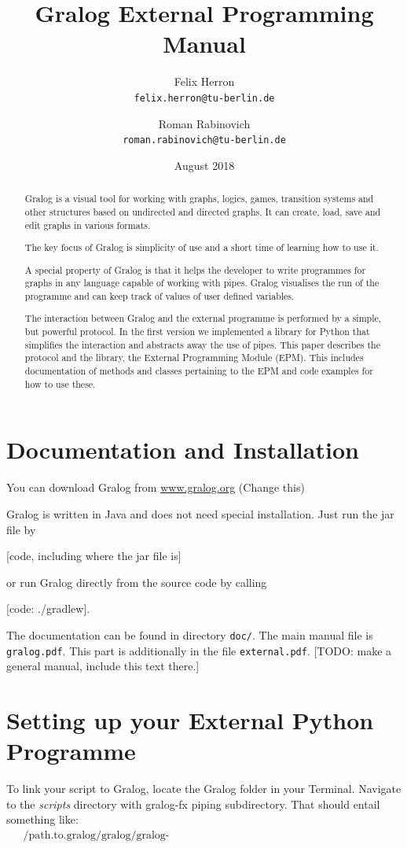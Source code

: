 \documentclass{article}
\title{Gralog External Programming Manual}
\author{Felix Herron\\\texttt{felix.herron@tu-berlin.de} \and Roman
  Rabinovich\\ \texttt{roman.rabinovich@tu-berlin.de}}
\date{August 2018}
\newcounter{example}
\begin{document}
\maketitle


\begin{abstract}
Gralog is a visual tool for working with graphs, logics, games,
transition systems and other structures based on undirected and
directed graphs. It can create, load, save and edit graphs in
various formats.

The key focus of Gralog is simplicity of use and a short time of
learning how to use it.

A special property of Gralog is that it helps the developer to write
programmes for graphs in any language capable of working with
pipes. Gralog visualises the run of the programme and can keep track
of values of user defined variables.

The interaction between Gralog and the external programme is
performed by a simple, but powerful protocol. In the first version
we implemented a library for Python that simplifies the interaction
and abstracts away the use of pipes. This paper describes the
protocol and the library, the External Programming Module (EPM). This
includes documentation of methods and classes pertaining to the
EPM and code examples for how to use these.
\end{abstract}

\section{Documentation and Installation}

You can download Gralog from \url{www.gralog.org} (Change this)

Gralog is written in Java and does not need special installation. Just
run the jar file by

[code, including where the jar file is]

or run Gralog directly from the source code by calling

[code: ./gradlew].

The documentation can be found in directory \texttt{doc/}. The main
manual file is \texttt{gralog.pdf}. This part is additionally in the
file \texttt{external.pdf}. [TODO: make a general manual, include this
text there.]



\section{Setting up your External Python Programme}
To link your script to Gralog, locate the Gralog folder in your
Terminal. Navigate to the \emph{scripts} directory with gralog-fx piping
subdirectory. That should entail something like:
\begin{align*}
&\text{~/path.to.gralog/gralog/gralog-fx/src/main/java/gralog/gralogfx/piping/scripts}
\end{align*}
\end{document}
